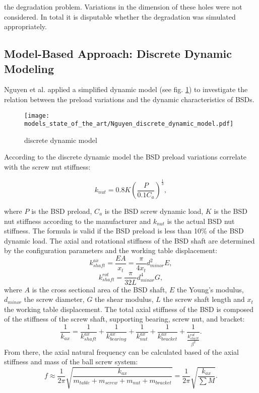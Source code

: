 the degradation problem. Variations in the dimension of these holes were not considered. In total it is disputable whether the degradation was simulated appropriately.  

\subsection{Model-Based Approach: Discrete Dynamic Modeling}
Nguyen et al. \cite{NGUYEN2019} applied a simplified dynamic model (see fig. \ref{fig:Nguyen_discrete_dynamic_model}) to investigate the relation between the preload variations and the dynamic characteristics of BSDs.

\begin{figure}[H]
  \centering
  \texttt{[image: models\_state\_of\_the\_art/Nguyen\_discrete\_dynamic\_model.pdf]}
  \caption{discrete dynamic model \cite{NGUYEN2019}}
  \label{fig:Nguyen_discrete_dynamic_model}
\end{figure}

According to the discrete dynamic model the BSD preload variations correlate with the screw nut stiffness:

\begin{equation}
    k_{nut}=0.8K(\frac{P}{0.1C_{a}})^{\frac{1}{3}},
\end{equation}

where $P$ is the BSD preload, $C_{a}$ is the BSD screw dynamic load, $K$ is the BSD nut stiffness according to the manufacturer and $k_{nut}$ is the actual BSD nut stiffness. The formula is valid if the BSD preload is less than 10\% of the BSD dynamic load. The axial and rotational stiffness of the BSD shaft are determined by the configuration parameters and the working table displacement:
\begin{equation}
    k_{shaft}^{ax}=\frac{EA}{x_{t}}=\frac{\pi}{4x_{t}}d_{minor}^{2}E,
\end{equation}
\begin{equation}
    k_{shaft}^{rot}=\frac{\pi}{32L}d_{minor}^{4}G,
\end{equation}
 where $A$ is the cross sectional area of the BSD shaft, $E$ the Young’s modulus, $d_{minor}$ the screw diameter, $G$ the shear modulus, $L$ the screw shaft length and $x_{t}$ the working table displacement. The total axial stiffness of the BSD is composed of the stiffness of the screw shaft, supporting bearing, screw nut, and bracket:
 \begin{equation}
    \frac{1}{k_{ax}}=\frac{1}{k_{shaft}^{ax}}+\frac{1}{k_{bearing}^{ax}}+\frac{1}{k_{nut}^{ax}}+\frac{1}{k_{bracket}^{ax}}+\frac{1}{\frac{k_{shaft}^{rot}}{\beta^{2}}}.
\end{equation}
From there, the axial natural frequency can be calculated based of the axial stiffness and mass of the ball screw system:
\begin{equation}
    f\approx\frac{1}{2\pi}\sqrt{\frac{k_{ax}}{m_{table}+m_{screw}+m_{nut}+m_{bracket}}}=\frac{1}{2\pi}\sqrt{\frac{k_{ax}}{\sum M}}.
\end{equation}

